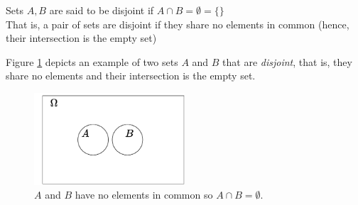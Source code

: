 \begin{definition}
    Sets $A, B$ are said to be disjoint if $A\cap B= \emptyset=\{\}$\steezybreak \\
    \noindent That is, a pair of sets are disjoint if they share no elements in common (hence, their intersection is the empty set)
\end{definition}

\noindent Figure \ref{fig:disjoint_sets} depicts an example of two sets $A$ and $B$ that are \textit{disjoint}, that is, they share no elements and their intersection is the empty set.
\begin{figure}[h!]
    \centering
    \includegraphics[width=0.5\textwidth]{Figures/disjoint_sets.pdf}
    \caption{$A$ and $B$ have no elements in common so $A\cap B=\emptyset$.}
    \label{fig:disjoint_sets}
\end{figure}

